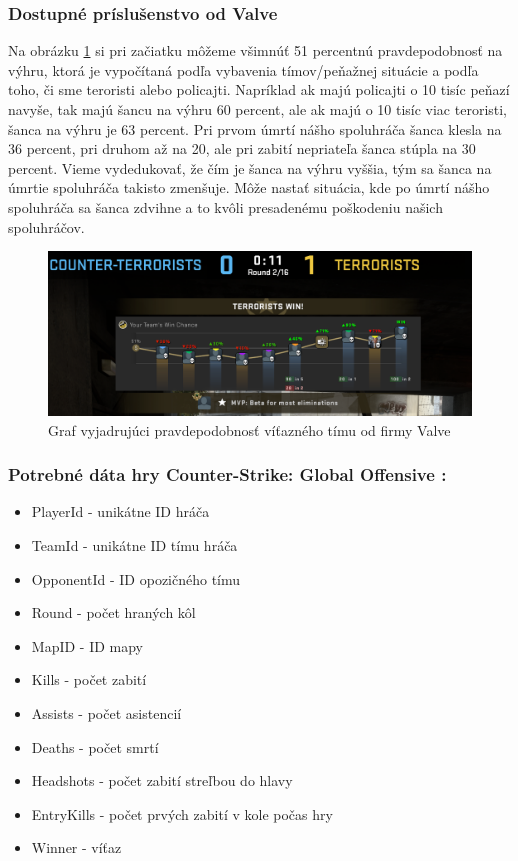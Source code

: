  \subsubsection{Dostupné príslušenstvo od Valve}
Na obrázku \ref{csgograf} si pri začiatku môžeme všimnúť 51 percentnú pravdepodobnosť na výhru, ktorá je vypočítaná podľa vybavenia tímov/peňažnej situácie a podľa toho, či sme teroristi alebo policajti. Napríklad ak majú policajti o 10 tisíc peňazí navyše, tak majú šancu na výhru 60 percent, ale ak majú o 10 tisíc viac teroristi, šanca na výhru je 63 percent. Pri prvom úmrtí nášho spoluhráča šanca klesla na 36 percent, pri druhom až na 20, ale pri zabití nepriateľa šanca stúpla na 30 percent. Vieme vydedukovať, že čím je šanca na výhru vyššia, tým sa šanca na úmrtie spoluhráča takisto zmenšuje. Môže nastať situácia, kde po úmrtí nášho spoluhráča sa šanca zdvihne a to kvôli presadenému poškodeniu našich spoluhráčov.
  
 \begin{figure}[h!]
 
 	\includegraphics[width=.9\textwidth]{figures/jednanula}
 	\centering
 	\caption{Graf vyjadrujúci pravdepodobnosť víťazného tímu od firmy Valve \label{csgograf}}

 \end{figure}

 

\subsubsection{Potrebné dáta hry Counter-Strike: Global Offensive :}

 \begin{itemize}
 	\item PlayerId - unikátne ID hráča
 	\item TeamId - unikátne ID tímu hráča
 	\item OpponentId - ID opozičného tímu
 	\item Round - počet hraných kôl
 	\item MapID - ID mapy
 	\item Kills - počet zabití
 	\item Assists - počet asistencií
 	\item Deaths - počet smrtí
 	\item Headshots - počet zabití streľbou do hlavy
 	\item EntryKills - počet prvých zabití v kole počas hry
 	\item Winner - víťaz
\end{itemize}
 

